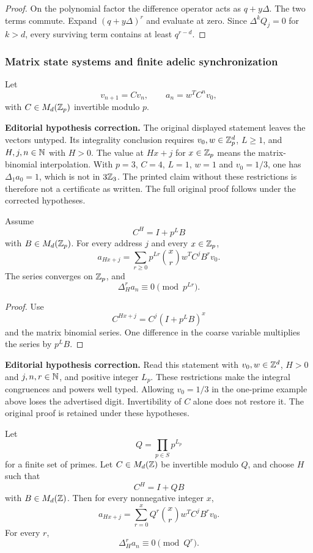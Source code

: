 \begin{proof}
On the polynomial factor the difference operator acts as \(q+y\Delta\). The two terms commute. Expand \((q+y\Delta)^r\) and evaluate at zero. Since \(\Delta^kQ_j=0\) for \(k>d\), every surviving term contains at least \(q^{r-d}\).
\end{proof}

\subsubsection{Matrix state systems and finite adelic synchronization}

Let
\[
v_{n+1}=Cv_n,
\qquad
a_n=w^TC^nv_0,
\]
with \(C\in M_d(\mathbb Z_p)\) invertible modulo \(p\).

\begin{histtheorem}\label{hist:thm:matrix_carmichael_mahler}
\par\noindent\textbf{Editorial hypothesis correction.} The original displayed statement leaves the vectors untyped. Its integrality conclusion requires $v_0,w\in\mathbb Z_p^d$, $L\ge1$, and $H,j,n\in\mathbb N$ with $H>0$. The value at $Hx+j$ for $x\in\mathbb Z_p$ means the matrix-binomial interpolation. With $p=3$, $C=4$, $L=1$, $w=1$ and $v_0=1/3$, one has $\Delta_1a_0=1$, which is not in $3\mathbb Z_3$. The printed claim without these restrictions is therefore not a certificate as written. The full original proof follows under the corrected hypotheses.\par\medskip
Assume
\[
C^H=I+p^LB
\]
with \(B\in M_d(\mathbb Z_p)\). For every address \(j\) and every \(x\in\mathbb Z_p\),
\[
\boxed{
a_{Hx+j}
=
\sum_{r\geq0}
p^{Lr}\binom xr
w^TC^jB^rv_0.
}
\]
The series converges on \(\mathbb Z_p\), and
\[
\boxed{
\Delta_H^ra_n
\equiv0
\pmod {p^{Lr}}.
}
\]
\end{histtheorem}

\begin{proof}
Use
\[
C^{Hx+j}=C^j(I+p^LB)^x
\]
and the matrix binomial series. One difference in the coarse variable multiplies the series by \(p^LB\).
\end{proof}

\begin{histtheorem}\label{hist:thm:finite_adelic_transfer}
\par\noindent\textbf{Editorial hypothesis correction.} Read this statement with $v_0,w\in\mathbb Z^d$, $H>0$ and $j,n,r\in\mathbb N$, and positive integer $L_p$. These restrictions make the integral congruences and powers well typed. Allowing $v_0=1/3$ in the one-prime example above loses the advertised digit. Invertibility of $C$ alone does not restore it. The original proof is retained under these hypotheses.\par\medskip
Let
\[
Q=\prod_{p\in S}p^{L_p}
\]
for a finite set of primes. Let \(C\in M_d(\mathbb Z)\) be invertible modulo \(Q\), and choose \(H\) such that
\[
C^H=I+QB
\]
with \(B\in M_d(\mathbb Z)\). Then for every nonnegative integer \(x\),
\[
\boxed{
a_{Hx+j}
=
\sum_{r=0}^{x}Q^r\binom xr
w^TC^jB^rv_0.
}
\]
For every \(r\),
\[
\boxed{
\Delta_H^ra_n\equiv0\pmod {Q^r}.
}
\]
\end{histtheorem}

